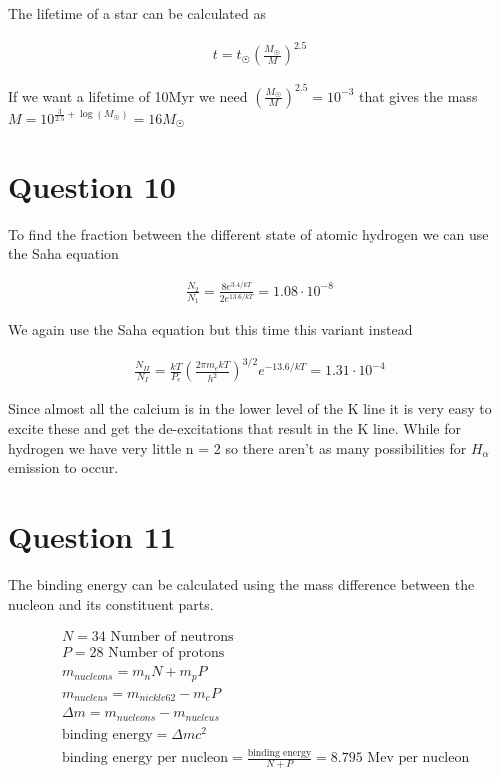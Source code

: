 \documentclass[a4paper]{article}
\begin{document}
The lifetime of a star can be calculated as

\begin{align}
    t = t_{\Sun} \left ( \frac{M_{\Sun}}{M} \right )^{2.5}
\end{align}

If we want a lifetime of 10Myr we need $\left ( \frac{M_{\Sun}}{M} \right )^{2.5} = 10^{-3}$ that gives the mass $M = 10^{\frac{3}{2.5} + \log (M_{\Sun})} = 16M_{\Sun}$

\section*{Question 10}

To find the fraction between the different state of atomic hydrogen we can use the Saha equation

\begin{align}
    \frac{N_2}{N_1} = \frac{8e^{3.4/kT}}{2e^{13.6/kT}} = 1.08 \cdot 10^{-8}
\end{align}

We again use the Saha equation but this time this variant instead

\begin{align}
    \frac{N_{II}}{N_{I}} = \frac{kT}{P_e} \left ( \frac{2\pi m_e k T}{h^2}  \right )^{3/2} e^{-13.6/kT} = 1.31 \cdot 10^{-4}
\end{align}

Since almost all the calcium is in the lower level of the K line it is very easy to excite these and get the de-excitations that result in the K line. While for hydrogen we have very little n = 2 so there aren't as many possibilities for $H_\alpha$ emission to occur. 

\pagebreak

\section*{Question 11}

The binding energy can be calculated using the mass difference between the nucleon and its constituent parts.

\begin{align}
    &N = 34 \text{ Number of neutrons}\\
    &P = 28 \text{ Number of protons}\\
    &m_{nucleons} = m_n N + m_p P \\
    &m_{nucleus} = m_{nickle62} - m_e P \\
    &\Delta m = m_{nucleons} - m_{nucleus} \\
    &\text{binding energy} = \Delta m c^2 \\
    &\text{binding energy per nucleon} = \frac{\text{binding energy}}{N+P} = 8.795 \text{ Mev per nucleon}
\end{align}
\end{document}
